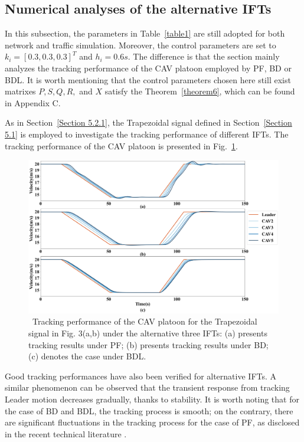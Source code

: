 \documentclass[a4paper]{cas-sc}
\begin{document}
\subsection{Numerical analyses of the alternative IFTs}
\label{Section 5.3}

In this subsection, the parameters in Table~\ref{table1} are still adopted for both network and traffic simulation. Moreover, the control parameters are set to ${k_i} = {[0.3,0.3,0.3]^T}$ and ${h_i} = 0.6s $. The difference is that the section mainly analyzes the tracking performance of the CAV platoon employed by PF, BD or BDL. It is worth mentioning that the control parameters chosen here still exist matrixes $P,S,Q,R,$ and $X$ satisfy the Theorem~\ref{theorem6}, which can be found in Appendix C.

As in Section~\ref{Section 5.2.1}, the Trapezoidal signal defined in Section~\ref{Section 5.1} is employed to investigate the tracking performance of different IFTs. The tracking performance of the CAV platoon is presented in Fig.~\ref{fig9}.


\begin{figure}

  \centering
  \includegraphics[width=14cm]{figs/fig9.png}
  \caption{~Tracking performance of the CAV platoon for the Trapezoidal signal in Fig. 3(a,b) under the alternative three IFTs: (a) presents tracking results under PF; (b) presents tracking results under BD; (c) denotes the case under BDL.}
  \label{fig9}
\end{figure}


Good tracking performances have also been verified for alternative IFTs. A similar phenomenon can be observed that the transient response from tracking Leader motion decreases gradually, thanks to stability. It is worth noting that for the case of BD and BDL, the tracking process is smooth; on the contrary, there are significant fluctuations in the tracking process for the case of PF, as disclosed in the recent technical literature \citep{Zheng2015}.
\end{document}

